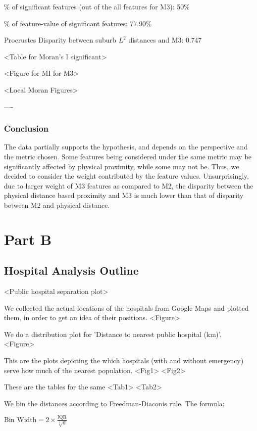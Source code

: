 \documentclass[
	a4paper, %
	10pt, %
	unnumberedsections, %
	twoside, %
]{LTJournalArticle}
\begin{document}
\% of significant features (out of the all features for M3): 50\%

\% of feature-value of significant features: 77.90\%

Procrustes Disparity between suburb $L^2$ distances and M3: 0.747

<Table for Moran's I significant>

<Figure for MI for M3>

<Local Moran Figures>

---- 

\subsubsection{Conclusion}\leavevmode

The data partially supports the hypothesis, and depends on the perspective and the metric chosen. Some features being considered under the same metric may be significantly affected by physical proximity, while some may not be. Thus, we decided to consider the weight contributed by the feature values. Unsurprisingly, due to larger weight of M3 features as compared to M2, the disparity between the physical distance based proximity and M3 is much lower than that of disparity between M2 and physical distance.

\section{Part B}


\subsection{Hospital Analysis Outline}

<Public hospital separation plot>

We collected the actual locations of the hospitals from Google Maps and plotted them, in order to get an idea of their positions. <Figure>

We do a distribution plot for 'Distance to nearest public hospital (km)'. <Figure>

This are the plots depicting the which hospitals (with and without emergency) serve how much of the nearest population. <Fig1> <Fig2>

These are the tables for the same <Tab1> <Tab2>

We bin the distances according to Freedman-Diaconis rule. The formula:

$\text{Bin Width} = 2 \times \frac{\text{IQR}}{\sqrt[3]{n}}$
\end{document}
